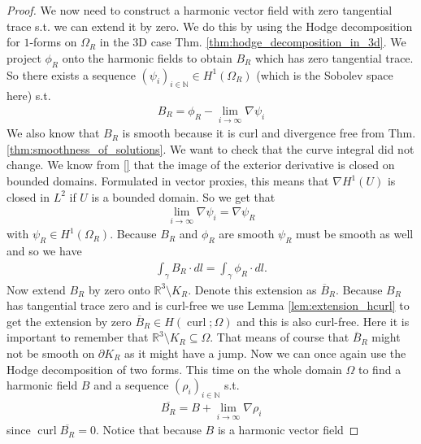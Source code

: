 \documentclass[12pt,a4paper]{article}
\numberwithin{equation}{subsection}
\numberwithin{lemma}{subsection}
\theoremstyle{definition}
\DeclareMathOperator{\curl}{curl}
\newcommand{\naturalnum}{\mathbb{N}}
\newcommand{\real}{\mathbb{R}}
\begin{document}
\begin{proof}
    We now need to construct a harmonic vector field with zero tangential trace
    s.t. we can extend it by zero. We do this by using the Hodge 
    decomposition for $1$-forms on $\Omega_R$ in the $3$D case Thm. \ref{thm:hodge_decomposition_in_3d}.
    We project $\phi_R$ onto the harmonic fields to obtain $B_R$ which has zero 
    tangential trace. So there exists a sequence 
    $(\psi_i)_{i \in \naturalnum} \in H^1(\Omega_R)$ (which is the Sobolev space here) s.t.
    \begin{align*}
        B_R = \phi_R - \lim\limits_{i\rightarrow \infty}\nabla \psi_i
    \end{align*}
    We also know that $B_R$ is smooth because 
    it is curl and divergence free from Thm.\ref{thm:smoothness_of_solutions}. 
    We want to check that the curve
    integral did not change. We know from \ref{} that the 
    image of the exterior derivative is closed on bounded domains. 
    Formulated in vector proxies, this
    means that $\nabla H^1(U)$ is closed in $L^2$ if $U$ is a bounded domain. 
    So we get that 
    \begin{align*}
        \lim\limits_{i\rightarrow \infty}\nabla \psi_i = \nabla \psi_R
    \end{align*}
    with $\psi_R \in H^1(\Omega_R)$. Because $B_R$ and $\phi_R$ are smooth
    $\psi_R$ must be smooth as well and so we have   
    \begin{align*}
        \int_\gamma B_R\cdot dl = \int_\gamma \phi_R\cdot dl.
    \end{align*}
    Now extend $B_R$ by zero onto $\real^3 \setminus K_R$.
    Denote this extension as $\overline{B}_R$.
    Because $B_R$ has tangential trace zero and is curl-free we use 
    Lemma \ref{lem:extension_hcurl} to get the extension by zero
    $\overline{B}_R \in H(\curl;\Omega)$ and this is also curl-free. 
    Here it is important to remember 
    that $\real^3 \setminus K_R \subseteq \Omega$. 
    That means of course that $\overline{B}_R$ 
    might not be smooth on $\partial K_R$ 
    as it might have a jump. 
    Now we can once again use the Hodge 
    decomposition of two forms. This time on the whole domain $\Omega$ to find 
    a harmonic field $B$ and a sequence $(\rho_i)_{i\in \naturalnum}$
    s.t.
    \begin{align*}
        \overline{B_R} = B 
            +\lim\limits_{i\rightarrow \infty}\nabla \rho_i
    \end{align*}
    since $\curl \overline{B_R} = 0$.
    Notice that because $B$ is a harmonic vector field 

\end{proof}
\end{document}

